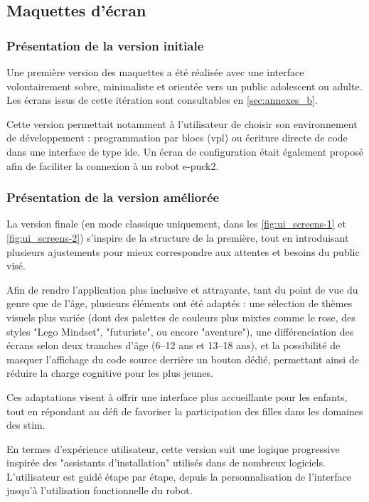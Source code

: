 \subsection{Maquettes d'écran} \label{sec:maquettes_ecran}

\subsubsection{Présentation de la version initiale}
Une première version des maquettes a été réalisée avec une interface volontairement sobre, minimaliste et orientée vers un public adolescent ou adulte. 
Les écrans issus de cette itération sont consultables en \autoref{sec:annexes_b}.

Cette version permettait notamment à l'utilisateur de choisir son environnement de développement : programmation par blocs (\acrshort{vpl}) ou écriture directe de code dans une interface de type \acrfull{ide}. 
Un écran de configuration était également proposé afin de faciliter la connexion à un robot e-puck2.

\subsubsection{Présentation de la version améliorée}
La version finale (en mode classique uniquement, dans les \autoref{fig:ui_screens-1} et \autoref{fig:ui_screens-2}) s'inspire de la structure de la première, tout en introduisant plusieurs ajustements pour mieux correspondre aux attentes et besoins du public visé.

Afin de rendre l'application plus inclusive et attrayante, tant du point de vue du genre que de l'âge, plusieurs éléments ont été adaptés : une sélection de thèmes visuels plus variée (dont des palettes de couleurs plus mixtes comme le rose, des styles "Lego Mindset", "futuriste", ou encore "aventure"), une différenciation des écrans selon deux tranches d'âge (6–12 ans et 13–18 ans), et la possibilité de masquer l'affichage du code source derrière un bouton dédié, permettant ainsi de réduire la charge cognitive pour les plus jeunes.

Ces adaptations visent à offrir une interface plus accueillante pour les enfants, tout en répondant au défi de favoriser la participation des filles dans les domaines des \acrfull{stim}.

En termes d’expérience utilisateur, cette version suit une logique progressive inspirée des "assistants d'installation" utilisés dans de nombreux logiciels. 
L'utilisateur est guidé étape par étape, depuis la personnalisation de l’interface jusqu’à l’utilisation fonctionnelle du robot.

